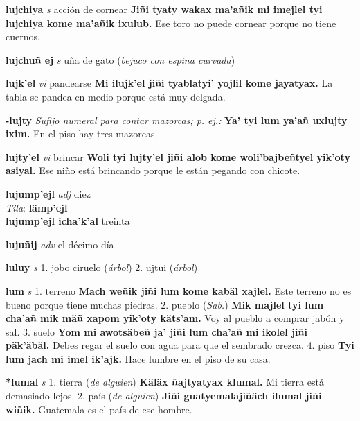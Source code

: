\documentclass[10pt]{scrbook}
\newcommand{\entry}[1]{\textbf{#1}}
\newcommand{\onedefinition}[1]{#1.}
\newcommand{\nontranslationdef}[1]{\textit{#1}}
\newcommand{\partofspeech}[1]{\textit{#1}}
\newcommand{\spanishtranslation}[1]{#1}
\newcommand{\clarification}[1]{(\textit{#1})}
\newcommand{\cholexample}[1]{\textbf{#1}}
\newcommand{\exampletranslation}[1]{#1}
\newcommand{\dialectvariant}[1]{\\\textit{#1}:}
\newcommand{\dialectword}[1]{\textbf{#1}}
\newcommand{\relevantdialect}[1]{(\textit{#1})}
\newcommand{\secondaryentry}[1]{\\\textbf{#1}}
\newcommand{\secondtranslation}[1]{#1}
\begin{document}
\begin{multicols}{2}
\entry{lujchiya}
\partofspeech{s}
\spanishtranslation{acción de cornear}
\cholexample{Jiñi tyaty wakax ma'añik mi imejlel tyi lujchiya kome ma'añik ixulub.}
\exampletranslation{Ese toro no puede cornear porque no tiene cuernos.}

\entry{lujchuñ ej}
\partofspeech{s}
\spanishtranslation{uña de gato}
\clarification{bejuco con espina curvada}

\entry{lujk'el}
\partofspeech{vi}
\spanishtranslation{pandearse}
\cholexample{Mi ilujk'el jiñi tyablatyi' yojlil kome jayatyax.}
\exampletranslation{La tabla se pandea en medio porque está muy delgada.}

\entry{-lujty}
\nontranslationdef{Sufijo numeral para contar mazorcas; p. ej.:}
\cholexample{Ya' tyi lum ya'añ uxlujty ixim.}
\exampletranslation{En el piso hay tres mazorcas.}

\entry{lujty'el}
\partofspeech{vi}
\spanishtranslation{brincar}
\cholexample{Woli tyi lujty'el jiñi alob kome woli'bajbeñtyel yik'oty asiyal.}
\exampletranslation{Ese niño está brincando porque le están pegando con chicote.}

\entry{lujump'ejl}
\partofspeech{adj}
\spanishtranslation{diez}
\dialectvariant{Tila}
\dialectword{lämp'ejl}
\secondaryentry{lujump'ejl icha'k'al}
\secondtranslation{treinta}

\entry{lujuñij}
\partofspeech{adv}
\spanishtranslation{el décimo día}

\entry{luluy}
\partofspeech{s}
\onedefinition{1}
\spanishtranslation{jobo}
\spanishtranslation{ciruelo}
\clarification{árbol}
\onedefinition{2}
\spanishtranslation{ujtui}
\clarification{árbol}

\entry{lum}
\partofspeech{s}
\onedefinition{1}
\spanishtranslation{terreno}
\cholexample{Mach weñik jiñi lum kome kabäl xajlel.}
\exampletranslation{Este terreno no es bueno porque tiene muchas piedras.}
\onedefinition{2}
\spanishtranslation{pueblo}
\relevantdialect{Sab.}
\cholexample{Mik majlel tyi lum cha'añ mik mäñ xapom yik'oty käts'am.}
\exampletranslation{Voy al pueblo a comprar jabón y sal.}
\onedefinition{3}
\spanishtranslation{suelo}
\cholexample{Yom mi awotsäbeñ ja' jiñi lum cha'añ mi ikolel jiñi päk'äbäl.}
\exampletranslation{Debes regar el suelo con agua para que el sembrado crezca.}
\onedefinition{4}
\spanishtranslation{piso}
\cholexample{Tyi lum jach mi imel ik'ajk.}
\exampletranslation{Hace lumbre en el piso de su casa.}

\entry{*lumal}
\partofspeech{s}
\onedefinition{1}
\spanishtranslation{tierra}
\clarification{de alguien}
\cholexample{Käläx ñajtyatyax klumal.}
\exampletranslation{Mi tierra está demasiado lejos.}
\onedefinition{2}
\spanishtranslation{país}
\clarification{de alguien}
\cholexample{Jiñi guatyemalajiñäch ilumal jiñi wiñik.}
\exampletranslation{Guatemala es el país de ese hombre.}


\end{multicols}
\end{document}
